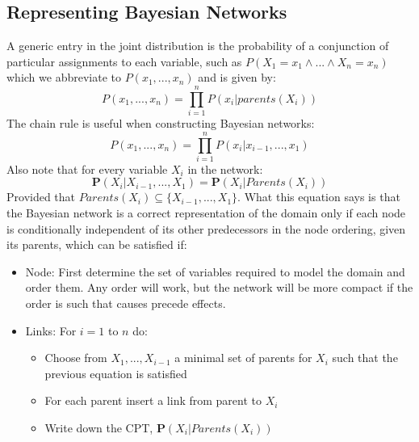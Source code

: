 \documentclass[twoside]{article}
\begin{document}
\subsection{Representing Bayesian Networks}
A generic entry in the joint distribution is the probability of a conjunction of
particular assignments to each variable, such as \(P(X_1=x_1 \land ... \land X_n = x_n)\)
which we abbreviate to \(P(x_1,...,x_n)\) and is given by:
\begin{equation}
        P(x_1,...,x_n) = \prod_{i=1}^n P(x_i|parents(X_i))
\end{equation}
The chain rule is useful when constructing Bayesian networks:
\begin{equation}
        P(x_1,...,x_n) = \prod_{i=1}^n P(x_i|x_{i-1},...,x_1)
\end{equation}
Also note that for every variable \(X_i\) in the network:
\begin{equation}
        \mathbf P(X_i|X_{i-1},...,X_1) = \mathbf P(X_i|Parents(X_i))
\end{equation}
Provided that \(Parents(X_i) \subseteq \{X_{i-1},...,X_1\}\). What this equation 
says is that the Bayesian network is a correct representation of the domain only 
if each node is conditionally independent of its other predecessors in the node 
ordering, given its parents, which can be satisfied if:
\begin{itemize}
        \item Node: First determine the set of variables required to model the 
        domain and order them. Any order will work, but the network will be more 
        compact if the order is such that causes precede effects.
        \item Links: For \(i=1\) to \(n\) do:
                \begin{itemize}
                        \item Choose from \(X_1,...,X_{i-1}\) a minimal set of 
                        parents for \(X_i\) such that the previous equation is 
                        satisfied
                        \item For each parent insert a link from parent to \(X_i\)
                        \item Write down the CPT, \(\mathbf P(X_i|Parents(X_i))\)
                \end{itemize}
\end{itemize}
\end{document}

